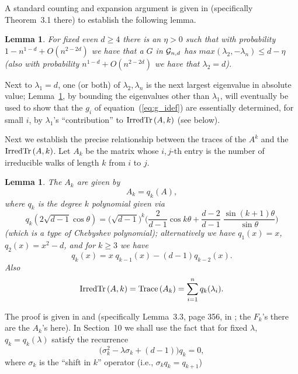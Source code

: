 \documentclass[12pt]{article}
\newtheorem{lemma}[theorem]{Lemma}
\newcommand{\cg}{{\cal G}}
\newcommand{\cgnd}{\cg_{n,d}}
\newcommand{\irdtr}[2]{{\rm IrredTr}\left(#1,#2\right)}
\newcommand{\Trace}[1]{{\rm Trace}\left( #1 \right) }
\begin{document}
A standard counting and expansion argument is given in
\cite{friedman_random_graphs} (specifically Theorem~3.1 there)
to establish the following lemma.
\begin{lemma}\label{lm:counting}
For fixed even $d\ge 4$ there is an $\eta>0$ such that
with probability $1-n^{1-d}+O(n^{2-2d})$ we have that a
$G$ in $\cgnd$ has $max(\lambda_2,-\lambda_n)\le d-\eta$
(also with probability $n^{1-d}+O(n^{2-2d})$ we have that
$\lambda_2=d$).
\end{lemma}

Next to $\lambda_1=d$, one (or both) of $\lambda_2,\lambda_n$ is
the next largest eigenvalue in absolute value; Lemma~\ref{lm:counting},
by bounding the eigenvalues other than $\lambda_1$, will eventually be
used to show that the $g_i$ of equation~(\ref{eq:g_idef}) are essentially
determined, for small $i$, by $\lambda_1$'s ``contribution'' to
$\irdtr{A}{k}$ (see below).

Next we establish
the precise relationship between the traces of the $A^k$ and the
$\irdtr{A}{k}$.  Let $A_k$ be the matrix whose $i,j$-th entry is the
number of irreducible walks of length $k$ from $i$ to $j$.
\begin{lemma}\label{lm:chebyshev}
The $A_k$ are given by
$$
A_k=q_k(A), 
$$
where $q_k$ is the degree $k$ polynomial given via
\begin{equation}\label{eq:chebyshev}
q_k( 2\sqrt{d-1}\cos\theta) = \bigl( \sqrt{d-1}\bigr)^k
\biggl( \frac{2}{d-1} \cos k\theta + \frac{d-2}{d-1}\;\frac{\sin (k+1)\theta}
{\sin\theta}\biggr) 
\end{equation}
(which is a type of Chebyshev polynomial);
alternatively we have $q_1(x)=x$, $q_2(x)=x^2-d$, and for $k\ge 3$ we have
$$
q_k(x) = x\;q_{k-1}(x)-(d-1)q_{k-2}(x).
$$
Also
$$
\irdtr{A}{k}=\Trace{A_k}=\sum_{i=1}^n q_k(\lambda_i).
$$
\end{lemma}
The proof is given in \cite{lubotzky} and
\cite{friedman_random_graphs} (specifically Lemma~3.3, page 356, in
\cite{friedman_random_graphs}; the $F_k$'s there are the $A_k$'s here).
In Section~10 we
shall use the fact that for fixed $\lambda$, $q_k=q_k(\lambda)$ 
satisfy the recurrence
$$
\bigl(\sigma_k^2-\lambda\sigma_k+(d-1)\bigr) q_k=0,
$$
where $\sigma_k$ is the ``shift in $k$'' operator (i.e., 
$\sigma_kq_k=q_{k+1}$)
\end{document}
